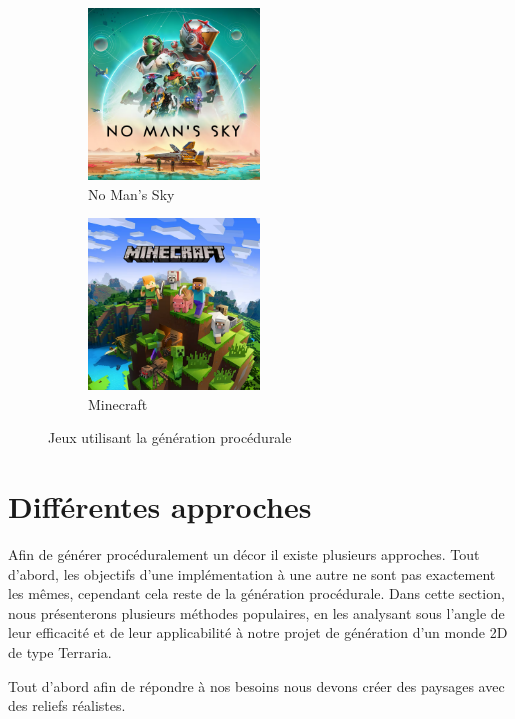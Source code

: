 \documentclass[12pt]{article}
\begin{document}
\begin{figure}[!h]
  \centering
  \begin{subfigure}[b]{0.4\textwidth}
    \centering
    \includegraphics[width=0.5\textwidth]{assets/nomanssky.png}
    \caption{No Man's Sky}
    \label{nomanssky}
  \end{subfigure}
  \hspace{0.6cm}
  \begin{subfigure}[b]{0.4\textwidth}
    \centering
    \includegraphics[width=0.5\textwidth]{assets/minecraft.png}
    \caption{Minecraft}
    \label{minecraft}
  \end{subfigure}
  \hspace{0.6cm}
  \label{games}
  \caption{Jeux utilisant la génération procédurale}
\end{figure}

\section{Différentes approches}

Afin de générer procéduralement un décor il existe plusieurs approches. Tout d'abord, les objectifs d'une implémentation à une autre ne sont pas exactement les mêmes, cependant cela reste de la génération procédurale. Dans cette section, nous présenterons plusieurs méthodes populaires, en les analysant sous l’angle de leur efficacité et de leur applicabilité à notre projet de génération d’un monde 2D de type Terraria.\par
Tout d'abord afin de répondre à nos besoins nous devons créer des paysages avec des reliefs réalistes.
\newpage
\vspace{1cm}
\end{document}
